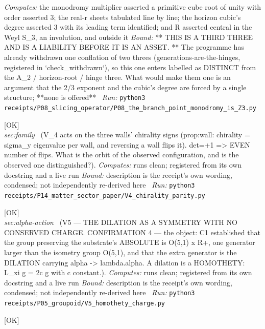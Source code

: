 \begin{description}
\emph{Computes:} the monodromy multiplier asserted a primitive cube root of unity with order asserted 3; the real-r sheets tabulated line by line; the horizon cubic's degree asserted 3 with its leading term identified; and R asserted central in the Weyl S\_3, an involution, and outside it
 \emph{Bound:} ** THIS IS A THIRD THREE AND IS A LIABILITY BEFORE IT IS AN ASSET. ** The programme has already withdrawn one conflation of two threes (generations-are-the-hinges, registered in `check\_withdrawn`), so this one enters labelled as DISTINCT from the A\_2 / horizon-root / hinge three. What would make them one is an argument that the 2/3 exponent and the cubic's degree are forced by a single structure; **none is offered**
\ \emph{Run:} \texttt{python3 receipts/P08\_slicing\_operator/P08\_the\_branch\_point\_monodromy\_is\_Z3.py}
\item[\label{rcpt:V4_chirality_parity}\texttt{V4\_chirality\_parity}]\hfill\textsf{[OK]}\\
\textit{sec:family} \ (V\_4 acts on the three walls' chirality signs (prop:wall: chirality = sigma\_y eigenvalue per wall, and reversing a wall flips it). det=+1 => EVEN number of flips. What is the orbit of the observed configuration, and is the observed one distinguished?). 
\emph{Computes:} runs clean; registered from its own docstring and a live run
 \emph{Bound:} description is the receipt's own wording, condensed; not independently re-derived here
\ \emph{Run:} \texttt{python3 receipts/P14\_matter\_sector\_paper/V4\_chirality\_parity.py}
\item[\label{rcpt:V5_homothety_charge}\texttt{V5\_homothety\_charge}]\hfill\textsf{[OK]}\\
\textit{sec:alpha-action} \ (V5 --- THE DILATION AS A SYMMETRY WITH NO CONSERVED CHARGE. CONFIRMATION 4 --- the object: C1 established that the group preserving the substrate's ABSOLUTE is O(5,1) x R+, one generator larger than the isometry group O(5,1), and that the extra generator is the DILATION carrying alpha -> lambda.alpha. A dilation is a HOMOTHETY: L\_xi g = 2c g with c constant.). 
\emph{Computes:} runs clean; registered from its own docstring and a live run
 \emph{Bound:} description is the receipt's own wording, condensed; not independently re-derived here
\ \emph{Run:} \texttt{python3 receipts/P05\_groupoid/V5\_homothety\_charge.py}
\item[\label{rcpt:I5_the_homothety_charge_is_a_first_integral_of_the_restricted_system}\texttt{I5\_the\_homothety\_charge\_is\_a\_first\_integral\_of\_the\_restricted\_system}]\hfill\textsf{[OK]}\\

\end{description}
